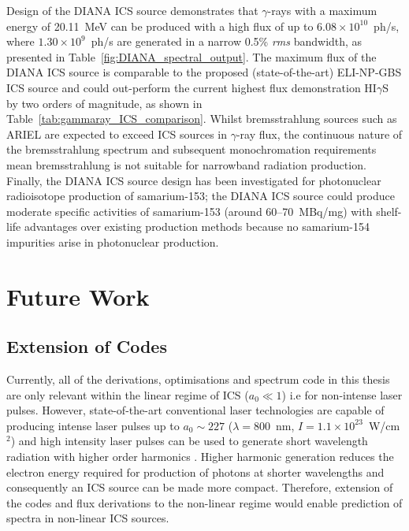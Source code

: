 \documentclass[../main.tex]{subfiles}
\begin{document}
Design of the DIANA ICS source demonstrates that $\gamma$-rays with a maximum energy of 20.11~\si{\mega\electronvolt} can be produced with a high flux of up to $6.08\times 10^{10}$~ph/\si{\second}, where $1.30\times 10^{9}$~ph/\si{\second} are generated in a narrow 0.5\% \textit{rms} bandwidth, as presented in Table~\ref{fig:DIANA_spectral_output}. The maximum flux of the DIANA ICS source is comparable to the proposed (state-of-the-art) ELI-NP-GBS \cite{elinp2019vega,tanaka2020current} ICS source and could out-perform the current highest flux demonstration HI$\gamma$S \cite{weller2009research} by two orders of magnitude, as shown in Table~\ref{tab:gammaray_ICS_comparison}. Whilst bremsstrahlung sources such as ARIEL \cite{dilling2013ariel,lebois2011simulations} are expected to exceed ICS sources in $\gamma$-ray flux, the continuous nature of the bremsstrahlung spectrum and subsequent monochromation requirements mean bremsstrahlung is not suitable for narrowband radiation production. Finally, the DIANA ICS source design has been investigated for photonuclear radioisotope production of samarium-153; the DIANA ICS source could produce moderate specific activities of samarium-153 (around 60--70~\si{\mega\becquerel}/\si{\milli\gram}) with shelf-life advantages over existing production methods because no samarium-154 impurities arise in photonuclear production. 

\section{Future Work}

\subsection{Extension of Codes}
Currently, all of the derivations, optimisations and spectrum code in this thesis are only relevant within the linear regime of ICS ($a_{0}\ll 1$) i.e for non-intense laser pulses. However, state-of-the-art conventional laser technologies are capable of producing intense laser pulses up to $a_{0}\sim227$ \cite{yoon2021realization} ($\lambda = 800$~\si{\nano\meter}, $I = 1.1\times 10^{23}$~\si{\watt}/\si{\centi\meter}$^{2}$) and high intensity laser pulses can be used to generate short wavelength radiation with higher order harmonics \cite{babzien2006observation,seipt2011nonlinear}. Higher harmonic generation reduces the electron energy required for production of photons at shorter wavelengths and consequently an ICS source can be made more compact. Therefore, extension of the codes and flux derivations to the non-linear regime would enable prediction of spectra in non-linear ICS sources. 
\end{document}

